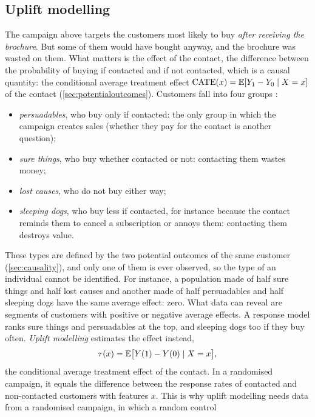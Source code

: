 \subsection{Uplift modelling}\label{sec:uplift}

The campaign above targets the customers most likely to buy \emph{after receiving the brochure}. But some of them would
have bought anyway, and the brochure was wasted on them. What matters is the effect of the contact, the difference between
the probability of buying if contacted and if not contacted, which is a causal quantity: the conditional average treatment effect
$\mathrm{CATE}(x)=\mathbb{E}[Y_1-Y_0\mid X=x]$ of the contact (\cref{sec:potentialoutcomes}). Customers
fall into four groups \citep{radcliffe2011real}:
\begin{itemize}
  \item \emph{persuadables}, who buy only if contacted: the only group in which the campaign creates sales (whether they pay for the contact
        is another question);
  \item \emph{sure things}, who buy whether contacted or not: contacting them wastes money;
  \item \emph{lost causes}, who do not buy either way;
  \item \emph{sleeping dogs}, who buy less if contacted, for instance because the contact reminds them to cancel a
        subscription or annoys them: contacting them destroys value.
\end{itemize}
These types are defined by the two potential outcomes of the same customer (\cref{sec:causality}), and only one of
them is ever observed, so the type of an individual cannot be identified. For instance, a population made of half sure things
and half lost causes and another made of half persuadables and half sleeping dogs have the same average effect:
zero. What data can reveal are segments of customers with positive or negative average effects.
A response model ranks sure things and persuadables at the top, and sleeping dogs too if they buy often. \emph{Uplift
modelling} estimates the effect instead,
\begin{equation}
  \tau(x)=\mathbb{E}\bigl[Y(1)-Y(0)\mid X=x\bigr],
\end{equation}
the conditional average treatment effect of the contact. In a randomised campaign, it equals the
difference between the response rates of contacted and non-contacted customers with features $x$. This is why uplift modelling needs data from a randomised campaign, in which a random control
